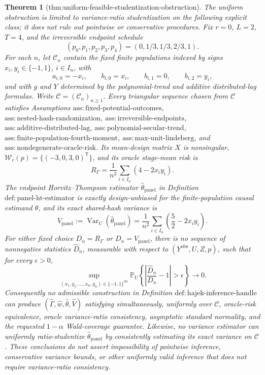 \documentclass{article}
\newtheorem{theorem}{Theorem}
\begin{document}
\begin{theorem}[thm:uniform-feasible-studentization-obstruction]\label{thm:uniform-feasible-studentization-obstruction}
The uniform obstruction is limited to variance-ratio studentization on the following explicit class; it does not rule out pointwise or conservative procedures.  Fix \(r=0\), \(L=2\), \(T=4\), and the irreversible endpoint schedule
\[
 (p_0,p_1,p_2,p_3,p_4)=(0,1/3,1/3,2/3,1).
\]
For each \(n\), let \(\mathcal C_n\) contain the fixed finite populations indexed by signs \(x_i,y_i\in\{-1,1\}\), \(i\in I_n\), with
\[
 a_{i,0}=-x_i,\qquad b_{i,0}=x_i,\qquad b_{i,1}=0,\qquad b_{i,2}=y_i,
\]
and with \(g\) and \(Y\) determined by the polynomial-trend and additive distributed-lag formulas.  Write \(\mathcal C=(\mathcal C_n)_{n\ge1}\).  Every triangular sequence chosen from \(\mathcal C\) satisfies Assumptions \(\mathrm{ass:fixed\text{-}potential\text{-}outcomes}\), \(\mathrm{ass:nested\text{-}hash\text{-}randomization}\), \(\mathrm{ass:irreversible\text{-}endpoints}\), \(\mathrm{ass:additive\text{-}distributed\text{-}lag}\), \(\mathrm{ass:polynomial\text{-}secular\text{-}trend}\), \(\mathrm{ass:finite\text{-}population\text{-}fourth\text{-}moment}\), \(\mathrm{ass:max\text{-}unit\text{-}lindeberg}\), and \(\mathrm{ass:nondegenerate\text{-}oracle\text{-}risk}\).  Its mean-design matrix \(X\) is nonsingular, \(\mathcal W_c(p)=\{(-3,0,3,0)^{\mathsf T}\}\), and its oracle stage-mean risk is
\[
 R_\Gamma=\frac1{n^2}\sum_{i\in I_n}(4-2x_i y_i).
\]
The endpoint Horvitz--Thompson estimator \(\widehat\theta_{\mathrm{panel}}\) in Definition \(\mathrm{def:panel\text{-}ht\text{-}estimator}\) is exactly design-unbiased for the finite-population causal estimand \(\theta\), and its exact shared-hash variance is
\[
 V_{\mathrm{panel}}:=\operatorname{Var}_U(\widehat\theta_{\mathrm{panel}})=\frac1{n^2}\sum_{i\in I_n}\left(\frac52-2x_i y_i\right).
\]
For either fixed choice \(D_n=R_\Gamma\) or \(D_n=V_{\mathrm{panel}}\), there is no sequence of nonnegative statistics \(\widehat D_n\), measurable with respect to \((Y^{\mathrm{obs}},U,Z,p)\), such that for every \(\epsilon>0\),
\[
 \sup_{(x_1,y_1,\ldots,x_n,y_n)\in\{-1,1\}^{2n}}
 \mathbb P_U\!\left\{\left|\frac{\widehat D_n}{D_n}-1\right|>\epsilon\right\}
 \longrightarrow0.
\]
Consequently no admissible construction in Definition \(\mathrm{def:hajek\text{-}inference\text{-}handle}\) can produce \((\widehat\Gamma,\widehat w,\widehat\theta,\widehat V)\) satisfying simultaneously, uniformly over \(\mathcal C\), oracle-risk equivalence, oracle variance-ratio consistency, asymptotic standard normality, and the requested \(1-\alpha\) Wald-coverage guarantee.  Likewise, no variance estimator can uniformly ratio-studentize \(\widehat\theta_{\mathrm{panel}}\) by consistently estimating its exact variance on \(\mathcal C\).  These conclusions do not assert impossibility of pointwise inference, conservative variance bounds, or other uniformly valid inference that does not require variance-ratio consistency.
\end{theorem}
\end{document}
